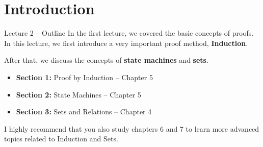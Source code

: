 \section{Introduction}

\begin{frame}[t]{Lecture 2 -- Outline}
  In the first lecture, we covered the basic concepts of proofs. In this lecture, we first introduce a very important proof method, {\bf Induction}.\medskip
  
  After that, we discuss the concepts of {\bf state machines} and {\bf sets}.\bigskip
  
  \begin{itemize}
    \item {\bf Section 1:} Proof by Induction -- Chapter 5
    \item {\bf Section 2:} State Machines -- Chapter 5
    \item {\bf Section 3:} Sets and Relations -- Chapter 4
  \end{itemize}\bigskip

  I highly recommend that you also study chapters 6 and 7 to learn more advanced topics related to Induction and Sets.
\end{frame}

